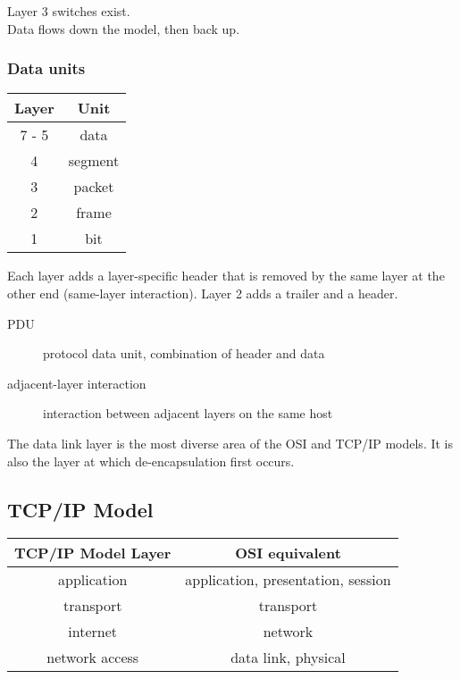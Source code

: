 Layer 3 switches exist.\\

Data flows down the model, then back up.

\subsubsection{Data units}

\begin{tabular}{ | c | c | }
\hline
Layer & Unit \\ \hline \hline
7 - 5 & data \\ \hline
4 & segment \\ \hline
3 & packet \\ \hline
2 & frame \\ \hline
1 & bit \\ \hline
\end{tabular}

Each layer adds a layer-specific header that is removed by the same layer at
the other end (same-layer interaction). Layer 2 adds a trailer and a header.

\begin{description}

\item[PDU]
protocol data unit, combination of header and data

\item[adjacent-layer interaction]
interaction between adjacent layers on the same host

\end{description}

The data link layer is the most diverse area of the OSI and TCP/IP models. It
is also the layer at which de-encapsulation first occurs.

\subsection{TCP/IP Model}

\begin{tabular}{ | c | c | }
\hline
TCP/IP Model Layer & OSI equivalent \\ \hline \hline
application & application, presentation, session \\ \hline
transport & transport \\ \hline
internet & network \\ \hline
network access & data link, physical\\ \hline
\end{tabular}

